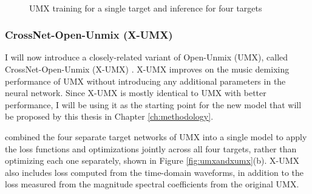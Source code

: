 \documentclass[report.tex]{subfiles}
\begin{document}
\begin{figure}[ht]
	\centering
	\\
	\caption{UMX training for a single target and inference for four targets}
	\label{fig:umxes2}
\end{figure}

\subsubsection{CrossNet-Open-Unmix (X-UMX)}
\label{sec:xumx}

I will now introduce a closely-related variant of Open-Unmix (UMX), called CrossNet-Open-Unmix (X-UMX) \parencite{xumx}. X-UMX improves on the music demixing performance of UMX without introducing any additional parameters in the neural network. Since X-UMX is mostly identical to UMX with better performance, I will be using it as the starting point for the new model that will be proposed by this thesis in Chapter \ref{ch:methodology}.

\textcite{xumx} combined the four separate target networks of UMX into a single model to apply the loss functions and optimizations jointly across all four targets, rather than optimizing each one separately, shown in Figure \ref{fig:umxandxumx}(b). X-UMX also includes loss computed from the time-domain waveforms, in addition to the loss measured from the magnitude spectral coefficients from the original UMX.
\end{document}
